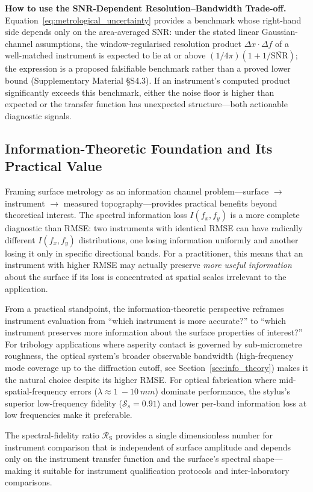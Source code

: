 \documentclass[review,12pt]{elsarticle}
\begin{document}
\textbf{How to use the SNR-Dependent Resolution--Bandwidth Trade-off.} Equation~\ref{eq:metrological_uncertainty} provides a benchmark whose right-hand side depends only on the area-averaged SNR: under the stated linear Gaussian-channel assumptions, the window-regularised resolution product $\Delta x \cdot \Delta f$ of a well-matched instrument is expected to lie at or above $(1/4\pi)(1 + 1/\overline{\mathrm{SNR}})$; the expression is a proposed falsifiable benchmark rather than a proved lower bound (Supplementary Material \S S4.3). If an instrument's computed product significantly exceeds this benchmark, either the noise floor is higher than expected or the transfer function has unexpected structure---both actionable diagnostic signals.

\subsection{Information-Theoretic Foundation and Its Practical Value}

Framing surface metrology as an information channel problem---surface $\to$ instrument $\to$ measured topography---provides practical benefits beyond theoretical interest. The spectral information loss $ I(f_x,f_y)$ is a more complete diagnostic than RMSE: two instruments with identical RMSE can have radically different $ I(f_x,f_y)$ distributions, one losing information uniformly and another losing it only in specific directional bands. For a practitioner, this means that an instrument with higher RMSE may actually preserve \emph{more useful information} about the surface if its loss is concentrated at spatial scales irrelevant to the application.

From a practical standpoint, the information-theoretic perspective reframes instrument evaluation from ``which instrument is more accurate?'' to ``which instrument preserves more information about the surface properties of interest?'' For tribology applications where asperity contact is governed by sub-micrometre roughness, the optical system's broader observable bandwidth (high-frequency mode coverage up to the diffraction cutoff, see Section~\ref{sec:info_theory}) makes it the natural choice despite its higher RMSE. For optical fabrication where mid-spatial-frequency errors ($\lambda \approx \SI{1}{-}\SI{10}{mm}$) dominate performance, the stylus's superior low-frequency fidelity ($\mathcal{S}_s=0.91$) and lower per-band information loss at low frequencies make it preferable.

The spectral-fidelity ratio $\mathcal{R}_\mathrm{S}$ provides a single dimensionless number for instrument comparison that is independent of surface amplitude and depends only on the instrument transfer function and the surface's spectral shape---making it suitable for instrument qualification protocols and inter-laboratory comparisons.
\end{document}
